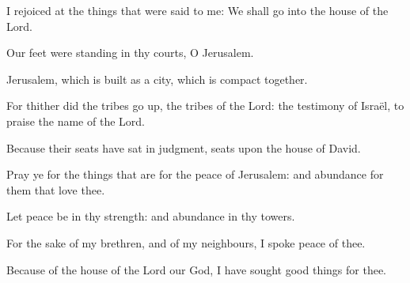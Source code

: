 ﻿\item I rejoiced at the things that were said to me: We shall go into the house of the Lord.
\item Our feet were standing in thy courts, O Jerusalem.
\item Jerusalem, which is built as a city, which is compact together.
\item For thither did the tribes go up, the tribes of the Lord: the testimony of Israël, to praise the name of the Lord.
\item Because their seats have sat in judgment, seats upon the house of David.
\item Pray ye for the things that are for the peace of Jerusalem: and abundance for them that love thee.
\item Let peace be in thy strength: and abundance in thy towers.
\item For the sake of my brethren, and of my neighbours, I spoke peace of thee.
\item Because of the house of the Lord our God, I have sought good things for thee.